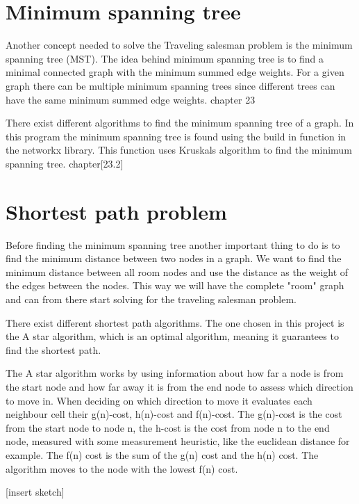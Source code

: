 \section{Minimum spanning tree}
Another concept needed to solve the Traveling salesman problem is the minimum spanning tree (MST). The idea behind minimum spanning tree is to find a minimal connected graph with the minimum summed edge weights. For a given graph there can be multiple minimum spanning trees since different trees can have the same minimum summed edge weights. chapter 23\cite{cormen2009introduction}

There exist different algorithms to find the minimum spanning tree of a graph. In this program the minimum spanning tree is found using the build in function in the networkx library. This function uses Kruskals algorithm to find the minimum spanning tree. chapter[23.2]\cite{cormen2009introduction}


\section{Shortest path problem} 
Before finding the minimum spanning tree another important thing to do is to find the minimum distance between two nodes in a graph. We want to find the minimum distance between all room nodes and use the distance as the weight of the edges between the nodes. This way we will have the complete "room" graph and can from there start solving for the traveling salesman problem.

There exist different shortest path algorithms. The one chosen in this project is the A star algorithm, which is an optimal algorithm, meaning it guarantees to find the shortest path. \cite{A_star} 

The A star algorithm works by using information about how far a node is from the start node and how far away it is from the end node to assess which direction to move in. When deciding on which direction to move it evaluates each neighbour cell their g(n)-cost, h(n)-cost and f(n)-cost. The g(n)-cost 
is the cost from the start node to node n, the h-cost is the cost from node n to the end node, measured with some measurement heuristic, like the euclidean distance for example. The f(n) cost is the sum of the g(n) cost and the h(n) cost. The algorithm moves to the node with the lowest f(n) cost.

[insert sketch]





